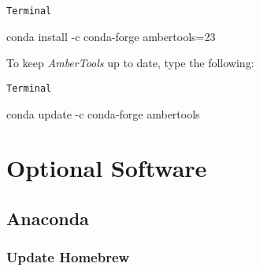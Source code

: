 \documentclass[
  letterpaper,
  DIV=11,
  numbers=noendperiod]{scrreprt}
\newenvironment{Shaded}{\begin{snugshade}}{\end{snugshade}}
\newcommand{\AttributeTok}[1]{\textcolor[rgb]{0.40,0.45,0.13}{#1}}
\newcommand{\ExtensionTok}[1]{\textcolor[rgb]{0.00,0.23,0.31}{#1}}
\newcommand{\NormalTok}[1]{\textcolor[rgb]{0.00,0.23,0.31}{#1}}
\begin{document}
\begin{codelisting}

\caption{\texttt{Terminal}}

\begin{Shaded}
\begin{Highlighting}[]
\ExtensionTok{conda}\NormalTok{ install }\AttributeTok{{-}c}\NormalTok{ conda{-}forge ambertools=23}
\end{Highlighting}
\end{Shaded}

\end{codelisting}

\begin{tcolorbox}[enhanced jigsaw, colback=white, breakable, titlerule=0mm, leftrule=.75mm, opacitybacktitle=0.6, bottomtitle=1mm, rightrule=.15mm, coltitle=black, arc=.35mm, bottomrule=.15mm, toprule=.15mm, title=\textcolor{quarto-callout-note-color}{\faInfo}\hspace{0.5em}{Note}, left=2mm, opacityback=0, colbacktitle=quarto-callout-note-color!10!white, colframe=quarto-callout-note-color-frame, toptitle=1mm]

To keep \emph{AmberTools} up to date, type the following:

\begin{codelisting}[H]

\caption{\texttt{Terminal}}

\begin{Shaded}
\begin{Highlighting}[]
\ExtensionTok{conda}\NormalTok{ update }\AttributeTok{{-}c}\NormalTok{ conda{-}forge ambertools}
\end{Highlighting}
\end{Shaded}

\end{codelisting}

\end{tcolorbox}

\section{Optional Software}\label{optional-software}

\subsection{Anaconda}\label{anaconda}

\subsubsection{Update Homebrew}\label{update-homebrew}
\end{document}
